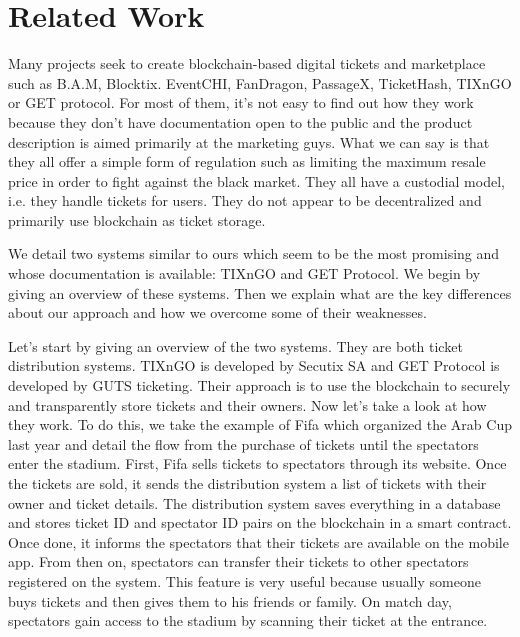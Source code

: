 \documentclass[a4paper,11pt,oneside]{report}
\begin{document}
\chapter{Related Work}
Many projects seek to create blockchain-based digital tickets and marketplace such as B.A.M, Blocktix. EventCHI, FanDragon, PassageX, TicketHash, TIXnGO or GET protocol. For most of them, it's not easy to find out how they work because they don't have documentation open to the public and the product description is aimed primarily at the marketing guys. What we can say is that they all offer a simple form of regulation such as limiting the maximum resale price in order to fight against the black market. They all have a custodial model, i.e. they handle tickets for users. They do not appear to be decentralized and primarily use blockchain as ticket storage.

We detail two systems similar to ours which seem to be the most promising and whose documentation is available: TIXnGO and GET Protocol. We begin by giving an overview of these systems. Then we explain what are the key differences about our approach and how we overcome some of their weaknesses.

Let's start by giving an overview of the two systems. They are both ticket distribution systems. TIXnGO is developed by Secutix SA and GET Protocol is developed by GUTS ticketing. Their approach is to use the blockchain to securely and transparently store tickets and their owners. Now let's take a look at how they work. To do this, we take the example of Fifa which organized the Arab Cup last year and detail the flow from the purchase of tickets until the spectators enter the stadium. First, Fifa sells tickets to spectators through its website. Once the tickets are sold, it sends the distribution system a list of tickets with their owner and ticket details. The distribution system saves everything in a database and stores ticket ID and spectator ID pairs on the blockchain in a smart contract. Once done, it informs the spectators that their tickets are available on the mobile app. From then on, spectators can transfer their tickets to other spectators registered on the system. This feature is very useful because usually someone buys tickets and then gives them to his friends or family. On match day, spectators gain access to the stadium by scanning their ticket at the entrance.
\end{document}
